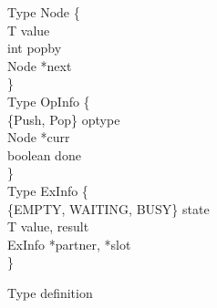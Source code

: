 \begin{figure*}[b]
	
	
	Type Node \{ \\
		\hspace*{6mm} T value \\
		\hspace*{6mm} int popby \\
		\hspace*{6mm} Node *next \\
	\} \\
	
	
	Type OpInfo \{ \\
		\hspace*{6mm} \{Push, Pop\} optype \\
		\hspace*{6mm} Node *curr \\
		\hspace*{6mm} boolean done \\
	\} \\
	
	
	Type ExInfo \{ \\
	\hspace*{6mm} \{EMPTY, WAITING, BUSY\} state \\
	\hspace*{6mm} T value, result \\
	\hspace*{6mm} ExInfo *partner, *slot \\
	\}
	
	\caption{Type definition}
\end{figure*}



